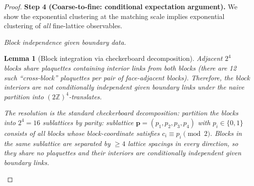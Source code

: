 \documentclass[11pt]{article}
\newtheorem{lemma}[theorem]{Lemma}
\theoremstyle{definition}
\newcommand{\Z}{\mathbb{Z}}
\begin{document}
\begin{proof}
\medskip\noindent\textbf{Step 4 (Coarse-to-fine: conditional
expectation argument).}
We show the exponential clustering at the matching scale implies
exponential clustering of \emph{all} fine-lattice observables.

\emph{Block independence given boundary data.}

\begin{lemma}[Block integration via checkerboard decomposition]%
\label{lem:plaquette-block}
Adjacent $2^4$ blocks share plaquettes containing interior links
from both blocks (there are 12 such ``cross-block'' plaquettes
per pair of face-adjacent blocks).  Therefore, the block interiors
are \emph{not} conditionally independent given boundary links
under the naive partition into $(2\Z)^4$-translates.

The resolution is the standard \emph{checkerboard decomposition}:
partition the blocks into $2^4=16$ sublattices by parity:
sublattice $\mathbf{p}=(p_1,p_2,p_3,p_4)$ with $p_i\in\{0,1\}$
consists of all blocks whose block-coordinate satisfies
$c_i\equiv p_i\pmod{2}$.  Blocks in the \emph{same} sublattice
are separated by $\ge 4$ lattice spacings in every direction,
so they share \emph{no} plaquettes and their interiors are
conditionally independent given boundary links.


\end{lemma}
\end{proof}
\end{document}
